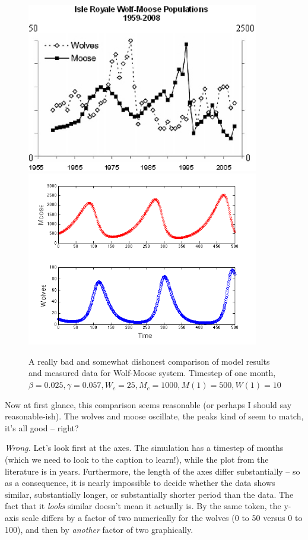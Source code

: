\begin{figure}[h!]
\includegraphics[width=4in]{figs/wolfmoosedata.jpg}
\includegraphics[width=4in]{figs/StackedWolfMooseTimeSeries}
\caption{A really bad and somewhat dishonest comparison of model results and measured data  for Wolf-Moose system. Timestep of one month,   $\beta = 0.025, \gamma = 0.057, W_c = 25, M_c=1000, M(1) = 500, W(1) = 10$}
\end{figure}

Now at first glance, this comparison seems reasonable (or perhaps I should say reasonable-ish).  The wolves and moose oscillate, the peaks kind of seem to match, it's all good -- right?

{\it Wrong.} Let's  look first at the axes.  The simulation has a timestep of months (which we need to look to the caption to learn!), while the plot from the literature is in years.  Furthermore, the length of the axes differ substantially -- so as a consequence, it is nearly impossible to decide whether the data shows similar, substantially longer, or substantially shorter period than the data.  The fact that it {\it looks} similar doesn't mean it actually is.  By the same token, the y-axis scale differs by a factor of two numerically for the wolves (0 to 50 versus 0 to 100), and then by {\it another} factor of two graphically.

